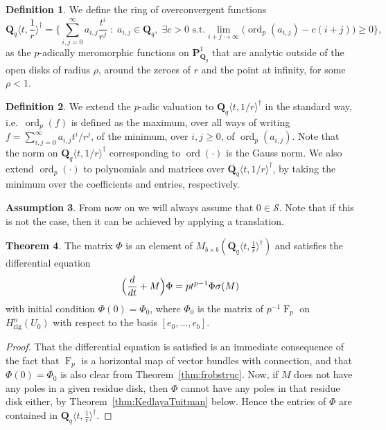 \documentclass[a4paper,11pt]{article}
\numberwithin{equation}{section}
\newcommand{\QQ}{\mathbf{Q}} %
\DeclareMathOperator{\ord}{ord}          %
\DeclareMathOperator{\Frob}{F}           %
\providecommand{\Hrig}{H_{\text{rig}}}  %
\theoremstyle{definition}
\newtheorem{thm}{Theorem}[section]
\newtheorem{defn}[thm]{Definition}
\newtheorem{assump}[thm]{Assumption}
\begin{document}
\begin{defn}
We define the ring of overconvergent functions
\[
\QQ_q \langle t, \frac{1}{r} \rangle^{\dag} = 
\biggl\{\sum_{i,j=0}^{\infty} a_{i,j} \frac{t^i}{r^j} \; : \; 
a_{i,j} \in \QQ_q, \; \exists c > 0 \text{ s.t.}  
\lim_{i+j \rightarrow \infty} \bigl(\ord_p(a_{i,j}) - c(i+j)\bigr) \geq 0
\biggr\},
\]
as the $p$-adically meromorphic functions on $\mathbf{P}^1_{\QQ_q}$ that are 
analytic outside of the open disks of radius $\rho$, around the zeroes of $r$ 
and the point at infinity, for some $\rho<1$. 
\end{defn}

\begin{defn}
We extend the $p$-adic valuation 
to $\QQ_q \langle t, 1/r \rangle^{\dag}$ in the standard way, i.e.\ 
$\ord_p(f)$ is defined as the maximum, over all ways of writing 
$f = \sum_{i,j=0}^{\infty} a_{i,j} t^i / r^j$,
of the minimum, over $i,j \geq 0$, of $\ord_p(a_{i,j})$. Note that the  
norm on $\QQ_q \langle t, 1/r \rangle^{\dag}$ corresponding to $\ord(\cdot)$ 
is the Gauss norm. We also extend $\ord_p(\cdot)$ to polynomials and matrices over 
$\QQ_q \langle t, 1/r \rangle^{\dag}$, by taking the 
minimum over the coefficients and entries, respectively.
\end{defn}

\begin{assump}
From now on we will always assume that $0 \in \mathcal{S}$. 
Note that if this is not the case, then it can be achieved by 
applying a translation.
\end{assump}

\begin{thm} \label{thm:eqphi} 
The matrix $\Phi$ is an element of 
$M_{b \times b}(\QQ_q \langle t, \frac{1}{r} \rangle^{\dag})$ 
and satisfies the differential equation
\begin{equation*}
\Bigl(\frac{d}{dt} + M\Bigr) \Phi = p t^{p-1} \Phi \sigma(M)
\end{equation*}
with initial condition $\Phi(0) = \Phi_0$, where $\Phi_0$ is the 
matrix of $p^{-1}\Frob_p$ on $\Hrig^n(U_0)$ with respect to the 
basis $[e_0,\dotsc,e_b]$.
\end{thm}

\begin{proof}
That the differential equation is satisfied is an immediate consequence of the 
fact that $\Frob_p$ is a horizontal map of vector bundles with connection, and 
that $\Phi(0)=\Phi_0$ is also clear from Theorem~\ref{thm:frobstruc}. Now, if 
$M$ does not have any poles in a given residue disk, then $\Phi$ cannot have 
any poles in that residue disk either, by Theorem~\ref{thm:KedlayaTuitman} 
below. Hence the entries of $\Phi$ are contained in 
$\QQ_q \langle t, \frac{1}{r} \rangle^{\dag}$.
\end{proof}
\end{document}
